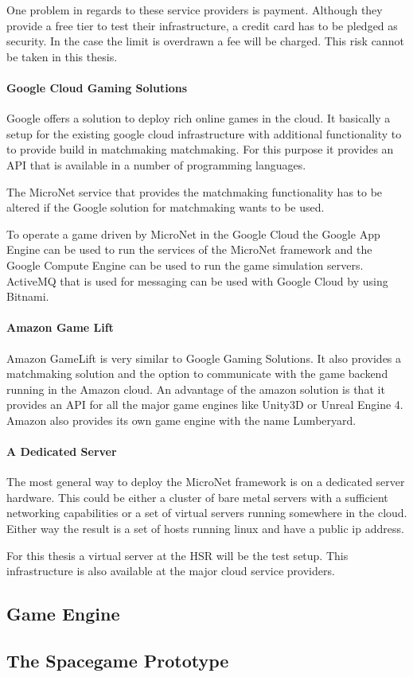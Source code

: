 One problem in regards to these service providers is payment. Although they
provide a free tier to test their infrastructure, a credit card has to be
pledged as security. In the case the limit is overdrawn a fee will be charged.
This risk cannot be taken in this thesis. 

\paragraph{Google Cloud Gaming Solutions}

Google offers a solution to deploy rich online games in the cloud. It basically
a setup for the existing google cloud infrastructure with additional
functionality to to provide build in matchmaking matchmaking. For this purpose
it provides an API that is available in a number of programming languages.

The MicroNet service that provides the matchmaking functionality has to be
altered if the Google solution for matchmaking wants to be used. 

To operate a game driven by MicroNet in the Google Cloud the Google App Engine
can be used to run the services of the MicroNet framework and the Google Compute
Engine can be used to run the game simulation servers. ActiveMQ that is used for
messaging can be used with Google Cloud by using Bitnami.

\paragraph{Amazon Game Lift}

Amazon GameLift is very similar to Google Gaming Solutions. It also provides a
matchmaking solution and the option to communicate with the game backend running
in the Amazon cloud. An advantage of the amazon solution is that it provides an
API for all the major game engines like Unity3D or Unreal Engine 4. Amazon also
provides its own game engine with the name Lumberyard.

\paragraph{A Dedicated Server}

The most general way to deploy the MicroNet framework is on a dedicated server
hardware. This could be either a cluster of bare metal servers with a sufficient
networking capabilities or a set of virtual servers running somewhere in the
cloud. Either way the result is a set of hosts running linux and have a public
ip address.

For this thesis a virtual server at the HSR will be the test setup. This
infrastructure is also available at the major cloud service providers.





\subsection{Game Engine}

\subsection{The Spacegame Prototype}

